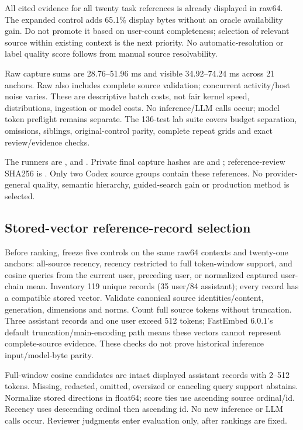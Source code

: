 \documentclass[11pt]{article}
\begin{document}
All cited evidence for all twenty task references is already displayed in raw64.
The expanded control adds 65.1\% display bytes without an oracle availability gain.
Do not promote it based on user-count completeness; selection of relevant source
within existing context is the next priority. No automatic-resolution or label
quality score follows from manual source resolvability.

Raw capture sums are 28.76--51.96 ms and visible 34.92--74.24 ms across 21 anchors.
Raw also includes complete source validation; concurrent activity/host noise varies.
These are descriptive batch costs, not fair kernel speed, distributions, ingestion
or model costs. No inference/LLM calls occur; model token preflight remains separate.
The 136-test lab suite covers budget separation, omissions, siblings, original-control
parity, complete repeat grids and exact review/evidence checks.

The runners are ,  and
. Private final capture hashes are
and ;
reference-review SHA256 is
.
Only two Codex source groups contain these references. No provider-general quality,
semantic hierarchy, guided-search gain or production method is selected.

\subsection{Stored-vector reference-record selection}
Before ranking, freeze five controls on the same raw64 contexts and twenty-one
anchors: all-source recency, recency restricted to full token-window support,
and cosine queries from the current user, preceding user, or normalized captured
user-chain mean. Inventory 119 unique records (35 user/84 assistant); every record
has a compatible stored vector. Validate canonical source identities/content,
generation, dimensions and norms. Count full source tokens without truncation.
Three assistant records and one user exceed 512 tokens; FastEmbed 6.0.1's default
truncation/main-encoding path means these vectors cannot represent complete-source
evidence. These checks do not prove historical inference input/model-byte parity.

Full-window cosine candidates are intact displayed assistant records with 2--512
tokens. Missing, redacted, omitted, oversized or canceling query support abstains.
Normalize stored directions in float64; score ties use ascending source ordinal/id.
Recency uses descending ordinal then ascending id. No new inference or LLM calls
occur. Reviewer judgments enter evaluation only, after rankings are fixed.
\end{document}
